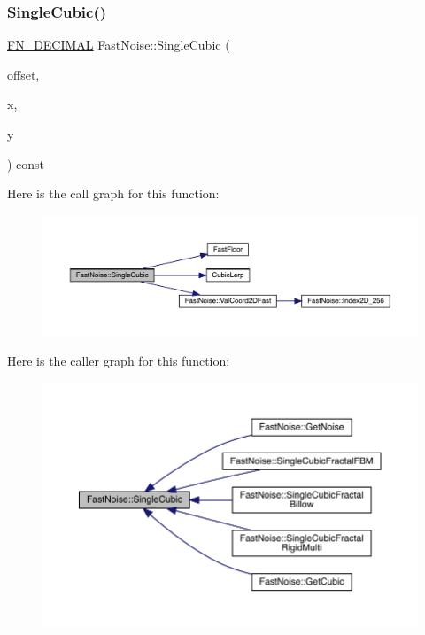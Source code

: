 \subsubsection{\texorpdfstring{Single\+Cubic()}{SingleCubic()}\hspace{0.1cm}{\footnotesize\ttfamily [1/2]}}
{\footnotesize\ttfamily \mbox{\hyperlink{_fast_noise_8h_a75a9ef6d2541c4921815b885bfd449c3}{F\+N\+\_\+\+D\+E\+C\+I\+M\+AL}} Fast\+Noise\+::\+Single\+Cubic (\begin{DoxyParamCaption}\item[{unsigned char}]{offset,  }\item[{\mbox{\hyperlink{_fast_noise_8h_a75a9ef6d2541c4921815b885bfd449c3}{F\+N\+\_\+\+D\+E\+C\+I\+M\+AL}}}]{x,  }\item[{\mbox{\hyperlink{_fast_noise_8h_a75a9ef6d2541c4921815b885bfd449c3}{F\+N\+\_\+\+D\+E\+C\+I\+M\+AL}}}]{y }\end{DoxyParamCaption}) const\hspace{0.3cm}{\ttfamily [private]}}

Here is the call graph for this function\+:
\nopagebreak
\begin{figure}[H]
\begin{center}
\leavevmode
\includegraphics[width=350pt]{class_fast_noise_a31ce14d8b90143da35b074d5fdeda85c_cgraph}
\end{center}
\end{figure}
Here is the caller graph for this function\+:
\nopagebreak
\begin{figure}[H]
\begin{center}
\leavevmode
\includegraphics[width=350pt]{class_fast_noise_a31ce14d8b90143da35b074d5fdeda85c_icgraph}
\end{center}
\end{figure}
\mbox{\label{class_fast_noise_a916d50d82702accf7842f5376619560e}} 
